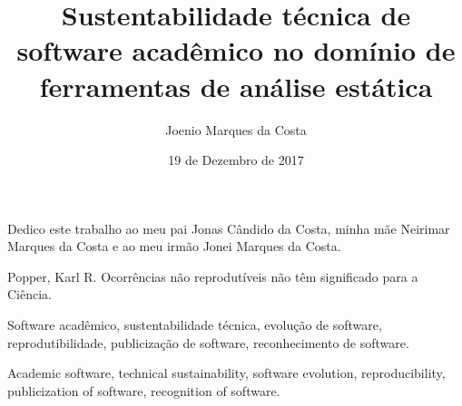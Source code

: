 \documentclass[msc, classic, a4paper]{ufbathesis}
\institute{Instituto de Matemática}
\date{19 de Dezembro de 2017}
\author{Joenio Marques da Costa}
\title{
  Sustentabilidade técnica de software acadêmico no domínio de ferramentas de
  análise estática
}
\begin{document}
\pgcompfrontpage
\frontmatter
\pgcomppresentationpage

\catalogingsheet


\begin{dedicatory}
Dedico este trabalho ao meu pai
Jonas Cândido da Costa, minha mãe
Neirimar Marques da Costa e ao meu irmão
Jonei Marques da Costa.
\end{dedicatory}

\acknowledgements


\begin{epigraph}[1959]{Popper, Karl R.}
Ocorrências não reprodutíveis não têm significado para a Ciência.
\end{epigraph}

\resumo


\begin{keywords}
Software acadêmico, sustentabilidade técnica, evolução de software,
reprodutibilidade, publicização de software, reconhecimento de software.
\end{keywords}

\abstract



\begin{keywords}
Academic software, technical sustainability, software evolution,
reproducibility, publicization of software, recognition of software.
\end{keywords}

\tableofcontents
\listoffigures
\listoftables
\mainmatter

\end{document}
